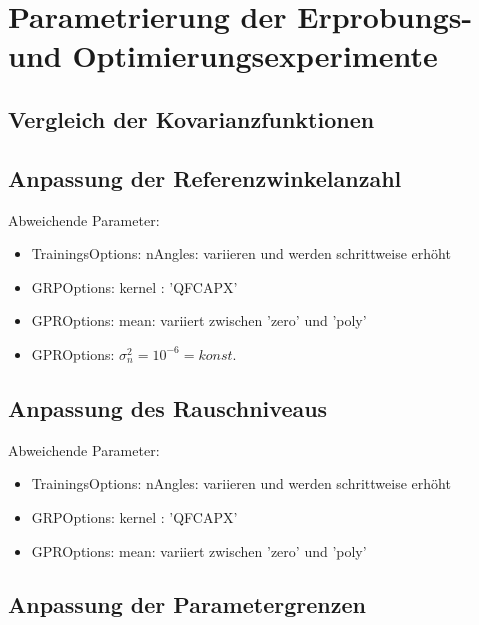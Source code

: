 %

\chapter{Parametrierung der Erprobungs- und Optimierungsexperimente}\label{ch:param-exp}




\section{Vergleich der Kovarianzfunktionen}\label{sec:paramexp1}



\section{Anpassung der Referenzwinkelanzahl}\label{sec:paramexp2}


Abweichende Parameter:

\begin{itemize}
	\item TrainingsOptions: nAngles: variieren und werden schrittweise erhöht
	\item GRPOptions: kernel : 'QFCAPX'
	\item GPROptions: mean: variiert zwischen 'zero' und 'poly'
	\item GPROptions: $\sigma_n^2 = 10^{-6} = konst.$
\end{itemize}


\section{Anpassung des Rauschniveaus}\label{sec:paramexp3}


Abweichende Parameter:

\begin{itemize}
	\item TrainingsOptions: nAngles: variieren und werden schrittweise erhöht
	\item GRPOptions: kernel : 'QFCAPX'
	\item GPROptions: mean: variiert zwischen 'zero' und 'poly'
\end{itemize}


\section{Anpassung der Parametergrenzen}\label{sec:paramexp4}


